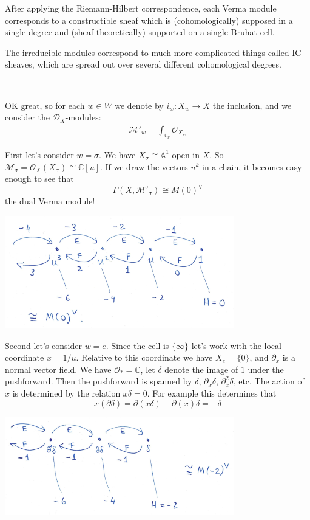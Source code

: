 \documentclass[12pt]{article}
\theoremstyle{plain}
\theoremstyle{definition}
\numberwithin{equation}{section}
\newcommand{\M}{\mathcal{M}}
\newcommand{\bbA}{\mathbb{A}}
\newcommand{\C}{\mathbb{C}}
\newcommand{\CD}{\mathcal{D}}
\newcommand{\OO}{\mathcal{O}}
\begin{document}
After applying the Riemann-Hilbert correspondence, each Verma module corresponds to a constructible sheaf which is (cohomologically) supposed in a single degree and (sheaf-theoretically) supported on a single Bruhat cell.

The irreducible modules correspond to much more complicated things called IC-sheaves, which are spread out over several different cohomological degrees.

--------------------



OK great, so for each $w \in W$ we denote by $i_w : X_w \rightarrow X$ the inclusion, and we consider the $\CD_X$-modules:
\begin{align*}
\M'_w = \int_{i_w} \OO_{X_w}
\end{align*}


First let's consider $w = \sigma$. We have $X_\sigma \cong \bbA^1$ open in $X$. So $\M_\sigma = \OO_X(X_\sigma) \cong \C[u]$. If we draw the vectors $u^k$ in a chain, it becomes easy enough to see that
\[
\Gamma(X, \M'_\sigma) \cong M(0)^\vee
\]
the dual Verma module!


\begin{center}
\includegraphics[width=100mm]{D-mod-big-cell.png}
\end{center}

Second let's consider $w = e$. Since the cell is $\{\infty\}$ let's work with the local coordinate $x = 1/u$. Relative to this coordinate we have $X_e = \{0\}$, and $\partial_x$ is a normal vector field. We have $\OO_{*} = \C$, let $\delta$ denote the image of $1$ under the pushforward. Then the pushforward is spanned by $\delta$, $\partial_x \delta$, $\partial_x^2 \delta$, etc. The action of $x$ is determined by the relation $x \delta = 0$. For example this determines that
\[
x(\partial \delta) = \partial(x \delta) - \partial(x) \delta = -\delta
\]




\begin{center}
\includegraphics[width=100mm]{D-mod-little-cell.png}
\end{center}
\end{document}
